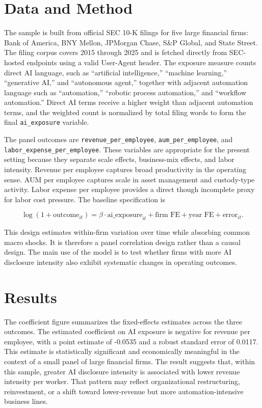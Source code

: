 \documentclass[11pt]{article}
\begin{document}
\section{Data and Method}
The sample is built from official SEC 10-K filings for five large financial firms: Bank of America, BNY Mellon, JPMorgan Chase, S\&P Global, and State Street. The filing corpus covers 2015 through 2025 and is fetched directly from SEC-hosted endpoints using a valid User-Agent header. The exposure measure counts direct AI language, such as ``artificial intelligence,'' ``machine learning,'' ``generative AI,'' and ``autonomous agent,'' together with adjacent automation language such as ``automation,'' ``robotic process automation,'' and ``workflow automation.'' Direct AI terms receive a higher weight than adjacent automation terms, and the weighted count is normalized by total filing words to form the final \texttt{ai\_exposure} variable.

The panel outcomes are \texttt{revenue\_per\_employee}, \texttt{aum\_per\_employee}, and \texttt{labor\_expense\_per\_employee}. These variables are appropriate for the present setting because they separate scale effects, business-mix effects, and labor intensity. Revenue per employee captures broad productivity in the operating sense. AUM per employee captures scale in asset management and custody-type activity. Labor expense per employee provides a direct though incomplete proxy for labor cost pressure. The baseline specification is

\begin{equation}
\log(1 + \text{outcome}_{it}) = \beta \cdot \text{ai\_exposure}_{it}
+ \text{firm FE} + \text{year FE} + \text{error}_{it}.
\label{eq:baseline}
\end{equation}

This design estimates within-firm variation over time while absorbing common macro shocks. It is therefore a panel correlation design rather than a causal design. The main use of the model is to test whether firms with more AI disclosure intensity also exhibit systematic changes in operating outcomes.

\section{Results}
The coefficient figure summarizes the fixed-effects estimates across the three outcomes. The estimated coefficient on AI exposure is negative for revenue per employee, with a point estimate of -0.0535 and a robust standard error of 0.0117. This estimate is statistically significant and economically meaningful in the context of a small panel of large financial firms. The result suggests that, within this sample, greater AI disclosure intensity is associated with lower revenue intensity per worker. That pattern may reflect organizational restructuring, reinvestment, or a shift toward lower-revenue but more automation-intensive business lines.
\end{document}
